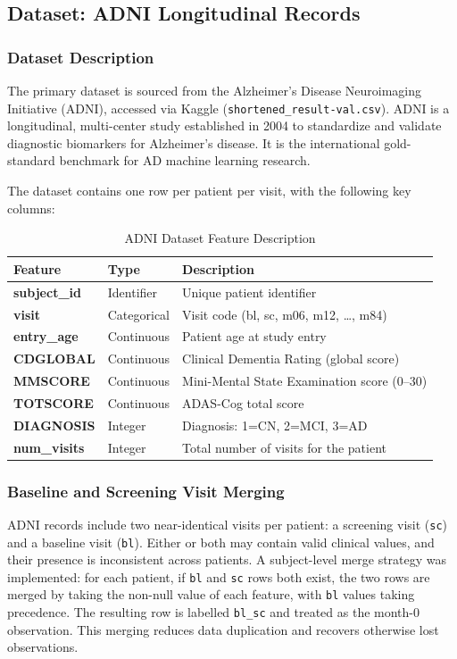 \documentclass[12pt,singleside,a4paper]{article}
\begin{document}
\subsection{Dataset: ADNI Longitudinal Records}

\subsubsection{Dataset Description}
The primary dataset is sourced from the Alzheimer's Disease Neuroimaging Initiative (ADNI), accessed via Kaggle (\texttt{shortened\_result-val.csv}). ADNI is a longitudinal, multi-center study established in 2004 to standardize and validate diagnostic biomarkers for Alzheimer's disease. It is the international gold-standard benchmark for AD machine learning research.

The dataset contains one row per patient per visit, with the following key columns:

\begin{table}[h]
\centering
\caption{ADNI Dataset Feature Description}
\begin{tabular}{>{\bfseries}p{2.8cm} p{4cm} p{5cm}}
\toprule
Feature & Type & Description \\
\midrule
subject\_id & Identifier & Unique patient identifier \\
visit & Categorical & Visit code (bl, sc, m06, m12, \ldots, m84) \\
entry\_age & Continuous & Patient age at study entry \\
CDGLOBAL & Continuous & Clinical Dementia Rating (global score) \\
MMSCORE & Continuous & Mini-Mental State Examination score (0--30) \\
TOTSCORE & Continuous & ADAS-Cog total score \\
DIAGNOSIS & Integer & Diagnosis: 1=CN, 2=MCI, 3=AD \\
num\_visits & Integer & Total number of visits for the patient \\
\bottomrule
\end{tabular}
\label{tab:adni_features}
\end{table}

\subsubsection{Baseline and Screening Visit Merging}
ADNI records include two near-identical visits per patient: a screening visit (\texttt{sc}) and a baseline visit (\texttt{bl}). Either or both may contain valid clinical values, and their presence is inconsistent across patients. A subject-level merge strategy was implemented: for each patient, if \texttt{bl} and \texttt{sc} rows both exist, the two rows are merged by taking the non-null value of each feature, with \texttt{bl} values taking precedence. The resulting row is labelled \texttt{bl\_sc} and treated as the month-0 observation. This merging reduces data duplication and recovers otherwise lost observations.
\end{document}
